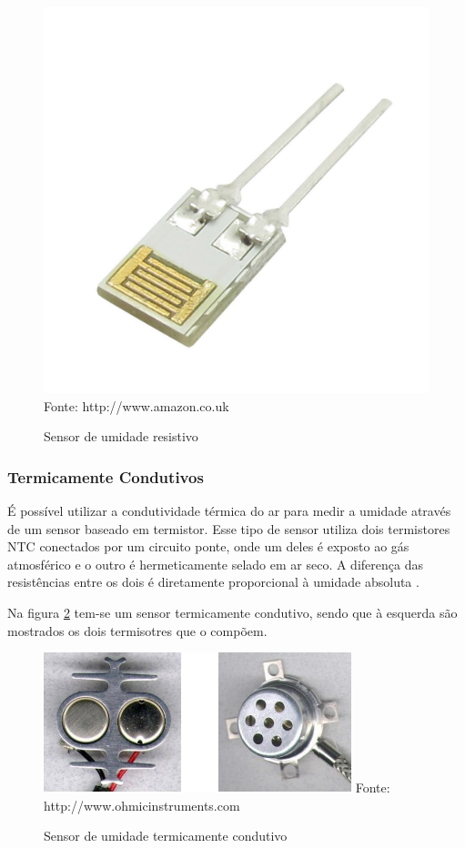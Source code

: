 \begin{figure}[h]
	\caption{Sensor de umidade resistivo}
	\centering
	\includegraphics[scale=0.15]{../images/resistive-humidity.jpg}
	\hspace{\linewidth}
	Fonte: http://www.amazon.co.uk
	\label{figura:resistive_humidity}
\end{figure}

\subsubsection{Termicamente Condutivos}
É possível utilizar a condutividade térmica do ar para medir a umidade através de um sensor baseado em
termistor. Esse tipo de sensor utiliza dois termistores NTC conectados por um circuito ponte, onde um deles é
exposto ao gás atmosférico e o outro é hermeticamente selado em ar seco. A diferença das resistências entre os
dois é diretamente proporcional à umidade absoluta \cite{fraden2010,fontesII2005}.

Na figura \ref{figura:thermal_conductivity_humidity} tem-se um sensor termicamente condutivo, sendo que à
esquerda são mostrados os dois termisotres que o compõem.

\begin{figure}[h]
	\caption{Sensor de umidade termicamente condutivo}
	\centering
	\includegraphics[scale=0.5]{../images/conductivity-humidity.jpg}
	\hspace{\linewidth}
	Fonte: http://www.ohmicinstruments.com
	\label{figura:thermal_conductivity_humidity}
\end{figure}

